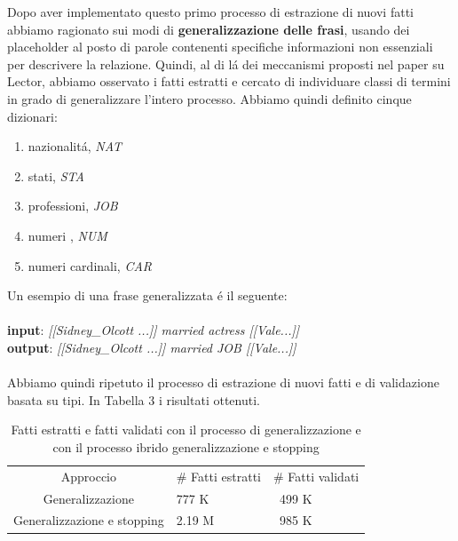 \documentclass[twocolumn,10pt]{asme2ej}
\begin{document}
Dopo aver implementato questo primo processo di estrazione di nuovi fatti abbiamo ragionato sui modi di \textbf{generalizzazione delle frasi}, usando dei placeholder al posto di parole contenenti specifiche informazioni non essenziali per descrivere la relazione. Quindi, al di l\'a dei meccanismi proposti nel paper su Lector, abbiamo osservato i fatti estratti e cercato di individuare classi di termini in grado di generalizzare l'intero processo. Abbiamo quindi definito cinque dizionari:
\begin{enumerate}
\item nazionalit\'a, \textit{NAT}
\item stati, \textit{STA}
\item professioni, \textit{JOB}
\item numeri , \textit{NUM}
\item numeri cardinali, \textit{CAR}
\end{enumerate}

Un esempio di una frase generalizzata \'e il seguente: \\\\ \textbf{input}: \textit{[[Sidney\_Olcott ...]]	married actress	[[Vale...]]}\\ \textbf{output}:  \textit{[[Sidney\_Olcott ...]]	married JOB	[[Vale...]]}\\\\ Abbiamo quindi ripetuto il processo di estrazione di nuovi fatti e di validazione basata su tipi. In Tabella 3 i risultati ottenuti.

\begin{table}[t]
\caption{Fatti estratti e fatti validati con il processo di generalizzazione e con il processo ibrido generalizzazione e stopping}
\begin{center}
\label{table_ASME}
\begin{tabular}{c l l}
& & \\ %
\hline
Approccio & \# Fatti estratti & \# Fatti validati \\
\hline
Generalizzazione & 777 K & \ 499 K \\
Generalizzazione e stopping & 2.19 M & \ 985 K \\

\hline
\end{tabular}
\end{center}
\end{table}
\end{document}
